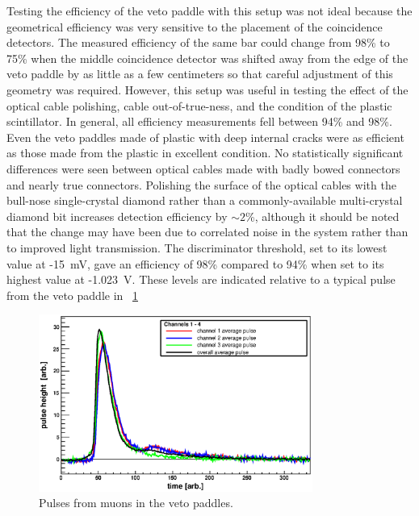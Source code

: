 Testing the efficiency of the veto paddle with this setup was not ideal because the geometrical efficiency was very sensitive to the placement of the coincidence detectors.  The measured efficiency of the same bar could change from 98\% to 75\% when the middle coincidence detector was shifted away from the edge of the veto paddle by as little as a few centimeters so that careful adjustment of this geometry was required.  However, this setup was useful in testing the effect of the optical cable polishing, cable out-of-true-ness, and the condition of the plastic scintillator.  In general, all efficiency measurements fell between 94\% and 98\%.  Even the veto paddles made of plastic with deep internal cracks were as efficient as those made from the plastic in excellent condition.  No statistically significant differences were seen between optical cables made with badly bowed connectors and nearly true connectors.  Polishing the surface of the optical cables with the bull-nose single-crystal diamond rather than a commonly-available multi-crystal diamond bit increases detection efficiency by $\sim2$\%, although it should be noted that the change may have been due to correlated noise in the system rather than to improved light transmission.  The discriminator threshold, set to its lowest value at -15~mV, gave an efficiency of 98\% compared to 94\% when set to its highest value at -1.023~V.  These levels are indicated relative to a typical pulse from the veto paddle in {\fig}~\ref{fig:vetoSignal}
\begin{figure}[!htbp]
\centering
\includegraphics[width=0.8\textwidth]{figures/PulseChan_1_4.eps}
\caption[Typical muon signals in the veto paddles.]{Pulses from muons in the veto paddles.}
\label{fig:vetoSignal}
\end{figure}

